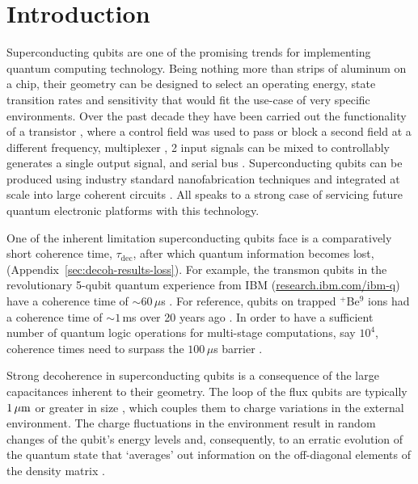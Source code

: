 
\section{Introduction}

\noindent Superconducting  qubits are  one of  the promising  trends for  implementing quantum
computing technology. Being nothing more than strips of aluminum on a chip, their geometry can
be designed to select  an operating energy, state transition rates  and sensitivity that would
fit the use-case of  very specific environments.  Over the past decade  they have been carried
out the functionality of a transistor \cite{Astafiev2010}\cite{hoi2011}, where a control field
was  used  to   pass  or  block  a   second  field  at  a   different  frequency,  multiplexer
\cite{honigl2018}, 2  input signals  can be  mixed to controllably  generates a  single output
signal, and serial bus \cite{shen2005}.  Superconducting qubits can be produced using industry
standard  nanofabrication techniques  and integrated  at  scale into  large coherent  circuits
\cite{johnson2010}.   All speaks  to  a strong  case of  servicing  future quantum  electronic
platforms with this technology.

One of the inherent limitation superconducting  qubits face is a comparatively short coherence
time,     $\tau_{\text{dec}}$,    after     which    quantum     information    becomes     lost,
(Appendix~\ref{sec:decoh-results-loss}).    For   example,   the  transmon   qubits   in   the
revolutionary          5-qubit          quantum          experience          from          IBM
(\href{http://www.research.ibm.com/ibm-q}{research.ibm.com/ibm-q})  have a  coherence time  of
$ \sim 60\,\mu $s \cite{linke2017}.  For reference, qubits on trapped $ ^{+} $Be$ ^{9} $ ions had a
coherence time of $\sim1\, $ms over 20 years ago \cite{monroe1995}. In order to have a sufficient
number of quantum logic operations for multi-stage computations, say $ 10^4 $, coherence times
need to surpass the $ 100\,\mu$s barrier \cite{orlando1999}.

Strong  decoherence in  superconducting  qubits is  a consequence  of  the large  capacitances
inherent   to   their    geometry.    The   loop   of   the   flux    qubits   are   typically
$           1\,\mu\text{m}$            or           greater            in           size
\cite{Astafiev2010}\cite{hoi2011}\cite{johnson2010}, which  couples them to  charge variations
in the  external environment.   The charge  fluctuations in the  environment result  in random
changes of the qubit's energy levels and, consequently, to an erratic evolution of the quantum
state  that `averages'  out information  on the  off-diagonal elements  of the  density matrix
\cite{devoret2008}.
 
